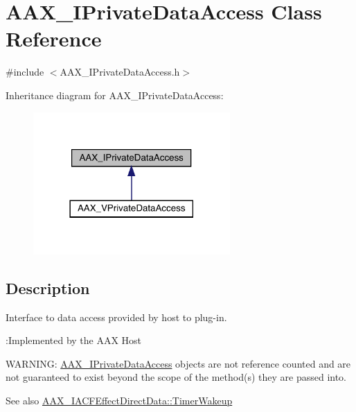 \hypertarget{a01865}{}\section{A\+A\+X\+\_\+\+I\+Private\+Data\+Access Class Reference}
\label{a01865}


{\ttfamily \#include $<$A\+A\+X\+\_\+\+I\+Private\+Data\+Access.\+h$>$}



Inheritance diagram for A\+A\+X\+\_\+\+I\+Private\+Data\+Access\+:
\nopagebreak
\begin{figure}[H]
\begin{center}
\leavevmode
\includegraphics[width=213pt]{a01864}
\end{center}
\end{figure}


\subsection{Description}
Interface to data access provided by host to plug-\/in. 

\begin{DoxyRefDesc}{\+:\+Implemented by the A\+A\+X Host}
\item[\mbox{\hyperlink{a00790__aax_host_implementation000010}{\+:\+Implemented by the A\+A\+X Host}}]\end{DoxyRefDesc}


W\+A\+R\+N\+I\+NG\+: \mbox{\hyperlink{a01865}{A\+A\+X\+\_\+\+I\+Private\+Data\+Access}} objects are not reference counted and are not guaranteed to exist beyond the scope of the method(s) they are passed into.

\begin{DoxySeeAlso}{See also}
\mbox{\hyperlink{a01661_afb4fa2c566547d7bd303166cf50741bb}{A\+A\+X\+\_\+\+I\+A\+C\+F\+Effect\+Direct\+Data\+::\+Timer\+Wakeup}} 
\end{DoxySeeAlso}
